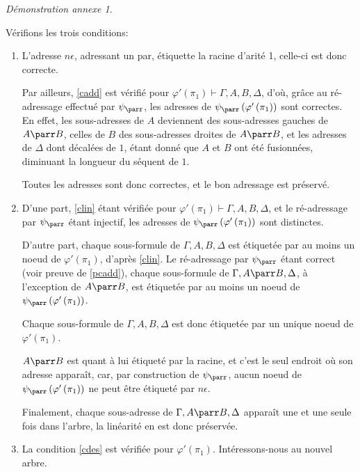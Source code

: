 \documentclass[11pt,a4paper]{article}
\theoremstyle{plain}
\theoremstyle{definition}
\theoremstyle{remark}
\newtheorem{demonstrationappendix}{Démonstration annexe}
\newcommand*{\sequent}{\Gamma}
\newcommand*{\sequentbis}{\Delta}
\newcommand*{\encode}{\ensuremath{\varphi}}
\begin{document}
\begin{demonstrationappendix}
\begin{description}
    Vérifions les trois conditions:
    \begin{enumerate}
        \item\label{pcadd} L'adresse $n \epsilon$, adressant un par, étiquette la racine d'arité 1, celle-ci est donc correcte.
        
        Par ailleurs, \ref{cadd} est vérifié pour $\encode ' \left( \pi_1 \right) \vdash \sequent, A, B, \sequentbis$, d'où, grâce au ré-adressage effectué par $\psi_\parr$, les adresses de $\psi_\parr \left( \encode' \left( \pi_1 \right) \right)$ sont correctes. En effet, les sous-adresses de $A$ deviennent des sous-adresses gauches de $A \parr B$, celles de $B$ des sous-adresses droites de $A \parr B$, et les adresses de $\sequentbis$ dont décalées de $1$, étant donné que $A$ et $B$ ont été fusionnées, diminuant la longueur du séquent de $1$.
        
        Toutes les adresses sont donc correctes, et le bon adressage est préservé.
        
        \item D'une part, \ref{clin} étant vérifiée pour $\encode ' \left( \pi_1 \right) \vdash \sequent, A, B, \sequentbis$, et le ré-adressage par $\psi_\parr$ étant injectif, les adresses de $\psi_\parr \left( \encode' \left( \pi_1 \right) \right)$ sont distinctes.
        
        D'autre part, chaque sous-formule de $\sequent, A, B, \sequentbis$ est étiquetée par au moins un noeud de $\encode ' \left( \pi_1 \right)$, d'après \ref{clin}. Le ré-adressage par $\psi_\parr$ étant correct (voir preuve de \ref{pcadd}), chaque sous-formule de $\sequent, A \parr B, \sequentbis$, à l'exception de $A \parr B$, est étiquetée par au moins un noeud de $\psi_\parr \left( \encode' \left( \pi_1 \right) \right)$.
        
        Chaque sous-formule de $\sequent, A, B, \sequentbis$ est donc étiquetée par un unique noeud de $\encode ' \left( \pi_1 \right)$.
        
        $A \parr B$ est quant à lui étiqueté par la racine, et c'est le seul endroit où son adresse apparaît, car, par construction de $\psi_\parr$, aucun noeud de $\psi_\parr \left( \encode' \left( \pi_1 \right) \right)$ ne peut être étiqueté par $n \epsilon$.

        Finalement, chaque sous-adresse de $\sequent, A \parr B, \sequentbis$ apparaît une et une seule fois dans l'arbre, la linéarité en est donc préservée.
        
        \item La condition \ref{cdes} est vérifiée pour $\encode ' \left( \pi_1 \right)$. Intéressons-nous au nouvel arbre.
        

\end{enumerate}
\end{description}
\end{demonstrationappendix}
\end{document}
